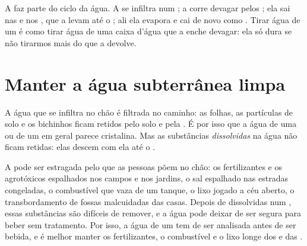 A  faz parte do ciclo da água. A  se infiltra num
; a  corre devagar pelos ; ela sai nas  e nos , que a levam até o ; ali
ela evapora e cai de novo como . Tirar água de um  é como
tirar água de uma caixa d'água que a  enche devagar: ela só dura se
não tirarmos mais do que a  devolve.

\section{Manter a água subterrânea limpa}

A água que se infiltra no chão é filtrada no caminho: as folhas, as
partículas de solo e os bichinhos ficam retidos pelo solo e pela . É
por isso que a água de uma  ou de um  em geral parece
cristalina. Mas as substâncias \emph{dissolvidas} na água não ficam
retidas: elas descem com ela até o .

A  pode ser estragada pelo que as pessoas põem no chão: os
fertilizantes e os agrotóxicos espalhados nos campos e nos jardins, o sal
espalhado nas estradas congeladas, o combustível que vaza de um tanque, o
lixo jogado a céu aberto, o transbordamento de fossas malcuidadas das
casas. Depois de dissolvidas num , essas substâncias são difíceis
de remover, e a água pode deixar de ser segura para beber sem tratamento. Por isso, a água de um  tem de ser analisada antes de ser bebida, e é melhor manter os fertilizantes, o combustível e o lixo longe dos  e das .

